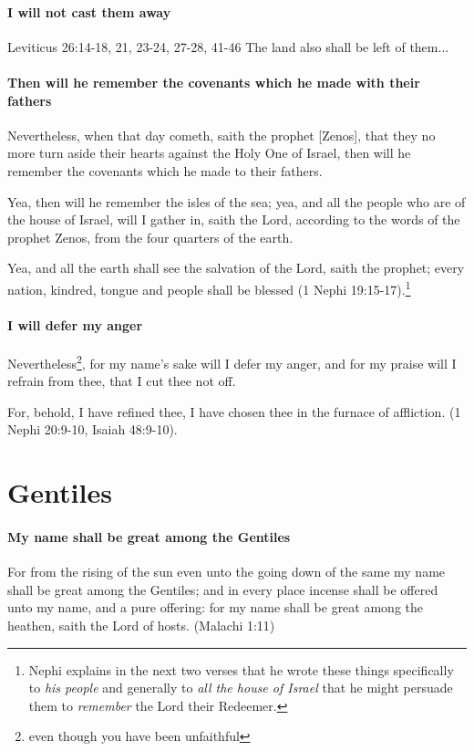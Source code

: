 \paragraph{I will not cast them away}
Leviticus 26:14-18, 21, 23-24, 27-28, 41-46
The land also shall be left of them...

\paragraph{Then will he remember the covenants which he made with their fathers}
Nevertheless, when that day cometh, saith the prophet [Zenos], that they no more turn aside their hearts against the Holy One of Israel, then will he remember the covenants which he made to their fathers.

Yea, then will he remember the isles of the sea; yea, and all the people who are of the house of Israel, will I gather in, saith the Lord, according to the words of the prophet Zenos, from the four quarters of the earth.

Yea, and all the earth shall see the salvation of the Lord, saith the prophet; every nation, kindred, tongue and people shall be blessed (1 Nephi 19:15-17).\footnote{Nephi explains in the next two verses that he wrote these things specifically to \textit{his people} and generally to \textit{all the house of Israel} that he might persuade them to \textit{remember} the Lord their Redeemer.}

\paragraph{I will defer my anger}
Nevertheless\footnote{even though you have been unfaithful}, for my name's sake will I defer my anger, and for my praise will I refrain from thee, that I cut thee not off.

For, behold, I have refined thee, I have chosen thee in the furnace of affliction. (1 Nephi 20:9-10, Isaiah 48:9-10).

\section{Gentiles}

\paragraph{My name shall be great among the Gentiles}
For from the rising of the sun even unto the going down of the same my name shall be great among the Gentiles; and in every place incense shall be offered unto my name, and a pure offering: for my name shall be great among the heathen, saith the Lord of hosts. (Malachi 1:11)

